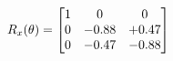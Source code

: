 \documentclass[preview]{standalone}
\begin{document}
\begin{align*}
\special{dvisvgm:raw <g id='unique000'>}R_{x}(\theta) = \begin{bmatrix}1 & 0 & 0 \\0 & -0.88 & +0.47 \\0 & -0.47 & -0.88\end{bmatrix}\special{dvisvgm:raw </g>}
\end{align*}
\end{document}
